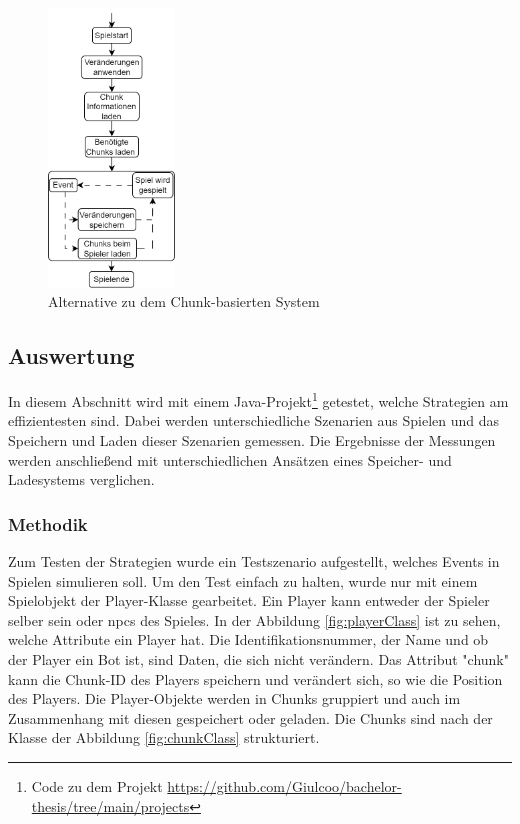 \begin{figure}[htp]
    \centering
    \includegraphics[width=0.3\textwidth]{images/Chunkbasiert2.png}
    \caption{Alternative zu dem Chunk-basierten System}
    \label{fig:altchunkBasedSystem}
\end{figure}


\subsection{Auswertung}
In diesem Abschnitt wird mit einem Java-Projekt\footnote{Code zu dem Projekt \url{https://github.com/Giulcoo/bachelor-thesis/tree/main/projects}} getestet, welche Strategien am effizientesten sind. Dabei werden unterschiedliche Szenarien aus Spielen und das Speichern und Laden dieser Szenarien gemessen. Die Ergebnisse der Messungen werden anschließend mit unterschiedlichen Ansätzen eines Speicher- und Ladesystems verglichen. 

\subsubsection{Methodik}
Zum Testen der Strategien wurde ein Testszenario aufgestellt, welches Events in Spielen simulieren soll. Um den Test einfach zu halten, wurde nur mit einem Spielobjekt der Player-Klasse gearbeitet. Ein Player kann entweder der Spieler selber sein oder \acp{npc} des Spieles. In der Abbildung \ref{fig:playerClass} ist zu sehen, welche Attribute ein Player hat. Die Identifikationsnummer, der Name und ob der Player ein Bot ist, sind Daten, die sich nicht verändern. Das Attribut "chunk" kann die Chunk-ID des Players speichern und verändert sich, so wie die Position des Players. Die Player-Objekte werden in Chunks gruppiert und auch im Zusammenhang mit diesen gespeichert oder geladen. Die Chunks sind nach der Klasse der Abbildung \ref{fig:chunkClass} strukturiert.

